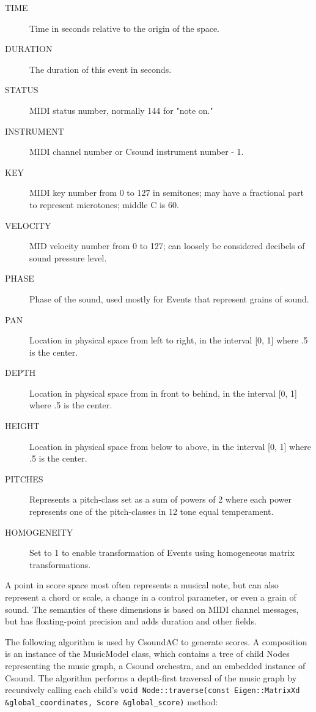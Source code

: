 \documentclass[letterpaper,10pt,DIV=12,parskip=half]{scrartcl}
\begin{document}
\begin{description}
\item[TIME] Time in seconds relative to the origin of the space.
\item[DURATION] The duration of this event in seconds.
\item[STATUS] MIDI status number, normally 144 for "note on."
\item[INSTRUMENT] MIDI channel number or Csound instrument number - 1.
\item[KEY] MIDI key number from 0 to 127 in semitones; may have a fractional part to represent microtones; middle C is 60.
\item[VELOCITY] MID velocity number from 0 to 127; can loosely be considered decibels of sound pressure level.
\item[PHASE] Phase of the sound, used mostly for Events that represent grains of sound.
\item[PAN] Location in physical space from left to right, in the interval [0, 1] where .5 is the center.
\item[DEPTH] Location in physical space from in front to behind, in the interval [0, 1] where .5 is the center.
\item[HEIGHT] Location in physical space from below to above, in the interval [0, 1] where .5 is the center.
\item[PITCHES] Represents a pitch-class set as a sum of powers of 2 where each power represents one of the pitch-classes in 12 tone equal temperament.
\item[HOMOGENEITY] Set to 1 to enable transformation of Events using homogeneous matrix transformations.
\end{description}

A point in score space most often represents a musical note, but can also represent a chord or scale, a change in a control parameter, or even a grain of sound. The semantics of these dimensions is based on MIDI channel messages, but has floating-point precision and adds duration and other fields.

The following algorithm is used by CsoundAC to generate scores. A composition is an instance of the MusicModel class, which contains a tree of child Nodes representing the music graph, a Csound orchestra, and an embedded instance of Csound. The algorithm performs a depth-first traversal of the music graph by recursively calling each child's \lstinline|void Node::traverse(const Eigen::MatrixXd &global_coordinates, Score &global_score)| method:
\end{document}
